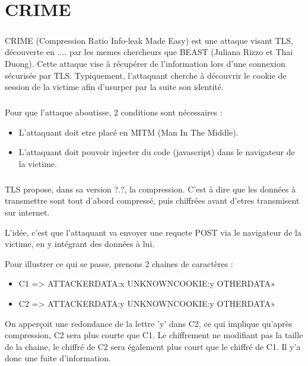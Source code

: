 \chapter{CRIME}

\paragraph{}
CRIME (Compression Ratio Info-leak Made Easy) est une attaque visant TLS, découverte en .... par les memes chercheurs que BEAST (Juliana Rizzo et Thai Duong). Cette attaque vise à récupérer de l'information lors d'une connexion sécurisée par TLS. Typiquement, l'attaquant cherche à découvrir le cookie de session de la victime afin d'usurper par la suite son identité.

\paragraph{}
Pour que l'attaque aboutisse, 2 conditions sont nécessaires :
\begin{itemize}
  \item L'attaquant doit etre placé en MITM (Man In The Middle).
  \item L'attaquant doit pouvoir injecter du code (javascript) dans le navigateur de la victime.
\end{itemize}

\paragraph{}
TLS propose, dans sa version ?.?, la compression. C'est à dire que les données à transmettre sont tout d'abord compressé, puis chiffrées avant d'etres transmisent sur internet.

L'idée, c'est que l'attaquant va envoyer une requete POST via le navigateur de la victime, en y intégrant des données à lui.

Pour illustrer ce qui se passe, prenons 2 chaines de caractères :
\begin{itemize}
\item C1 => ATTACKERDATA:x UNKNOWNCOOKIE:y OTHERDATA»
\item C2 => ATTACKERDATA:y UNKNOWNCOOKIE:y OTHERDATA»
\end{itemize}
On apperçoit une redondance de la lettre 'y' dans C2, ce qui implique qu'après compression, C2 sera plus courte que C1. Le chiffrement ne modifiant pas la taille de la chaine, le chiffré de C2 sera également plus court que le chiffré de C1. Il y'a donc une fuite d'information.

